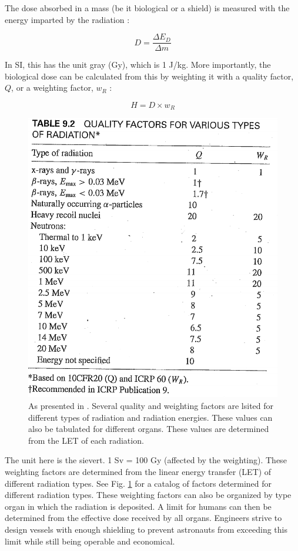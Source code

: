 The dose absorbed in a mass (be it biological or a shield) is measured with the energy imparted by the radiation \cite{lamarsh}:

\begin{equation}
D = \frac{\Delta E_{D}}{\Delta m}
\end{equation}

In SI, this has the unit gray (Gy), which is 1 J/kg. More importantly, the biological dose can be calculated from this by weighting it with a quality factor, $Q$, or a weighting factor, $w_{R}$ \cite{lamarsh}:

\begin{equation}
H = D \times w_{R}
\end{equation}

\begin{figure}
\centering
\includegraphics[width=\linewidth]{wr.png}
\caption{As presented in \cite{lamarsh}. Several quality and weighting factors are lsited for different types of radiation and radiation energies. These values can also be tabulated for different organs. These values are determined from the LET of each radiation.}
\label{fig:wr}
\end{figure}

The unit here is the sievert. 1 Sv = 100 Gy (affected by the weighting). These weighting factors are determined from the linear energy transfer (LET) of different radiation types. See Fig. \ref{fig:wr} for a catalog of factors determined for different radiation types. These weighting factors can also be organized by type organ in which the radiation is deposited. A limit for humans can then be determined from the effective dose received by all organs. Engineers strive to design vessels with enough shielding to prevent astronauts from exceeding this limit while still being operable and economical.
